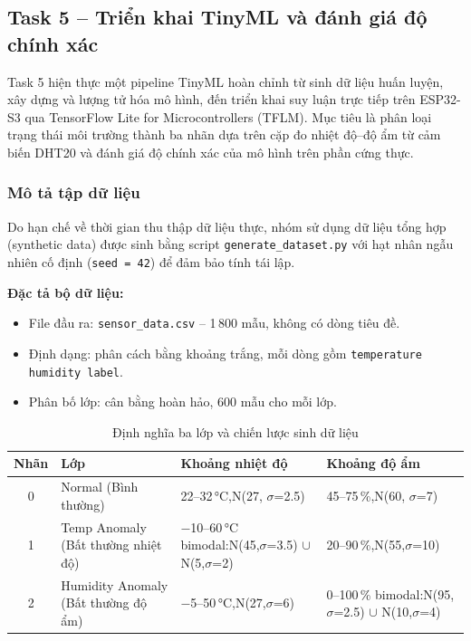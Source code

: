 \subsection{Task 5 -- Triển khai TinyML và đánh giá độ chính xác}

Task 5 hiện thực một pipeline TinyML hoàn chỉnh từ sinh dữ liệu huấn luyện, xây dựng và lượng tử hóa mô hình, đến triển khai suy luận trực tiếp trên ESP32-S3 qua TensorFlow Lite for Microcontrollers (TFLM). Mục tiêu là phân loại trạng thái môi trường thành ba nhãn dựa trên cặp đo nhiệt độ--độ ẩm từ cảm biến DHT20 và đánh giá độ chính xác của mô hình trên phần cứng thực.

\subsubsection*{Mô tả tập dữ liệu}

Do hạn chế về thời gian thu thập dữ liệu thực, nhóm sử dụng dữ liệu tổng hợp (synthetic data) được sinh bằng script \texttt{generate\_dataset.py} với hạt nhân ngẫu nhiên cố định (\texttt{seed = 42}) để đảm bảo tính tái lập.

\textbf{Đặc tả bộ dữ liệu:}
\begin{itemize}
    \item File đầu ra: \texttt{sensor\_data.csv} -- 1\,800 mẫu, không có dòng tiêu đề.
    \item Định dạng: phân cách bằng khoảng trắng, mỗi dòng gồm \texttt{temperature humidity label}.
    \item Phân bố lớp: cân bằng hoàn hảo, 600 mẫu cho mỗi lớp.
\end{itemize}

\begin{table}[h!]
\centering
\caption{Định nghĩa ba lớp và chiến lược sinh dữ liệu}
\label{tab:task5-dataset}
\begin{tabular}{|c|p{3cm}|p{3.8cm}|p{3.8cm}|}
\hline
\textbf{Nhãn} & \textbf{Lớp} & \textbf{Khoảng nhiệt độ} & \textbf{Khoảng độ ẩm} \\
\hline
0 & Normal (Bình thường) & 22--32\,°C,\newline N(27, $\sigma$=2.5) & 45--75\,\%,\newline N(60, $\sigma$=7) \\
\hline
1 & Temp Anomaly (Bất thường nhiệt độ) & $-$10--60\,°C bimodal:\newline N(45,$\sigma$=3.5) $\cup$ N(5,$\sigma$=2) & 20--90\,\%,\newline N(55,$\sigma$=10) \\
\hline
2 & Humidity Anomaly (Bất thường độ ẩm) & $-$5--50\,°C,\newline N(27,$\sigma$=6) & 0--100\,\% bimodal:\newline N(95,$\sigma$=2.5) $\cup$ N(10,$\sigma$=4) \\
\hline
\end{tabular}
\end{table}

